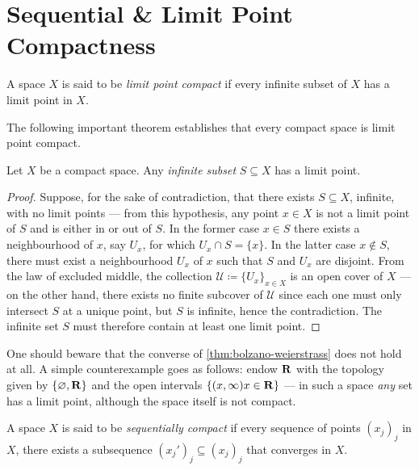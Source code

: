 \section{Sequential \& Limit Point Compactness}

\begin{definition}
\label{def:limit-point-compact}
A space \(X\) is said to be \emph{limit point compact} if every infinite subset
of \(X\) has a limit point in \(X\).
\end{definition}

The following important theorem establishes that every compact space is limit
point compact.

\begin{theorem}
\label{thm:bolzano-weierstrass}
Let \(X\) be a compact space. Any \emph{infinite subset} \(S \subseteq X\) has a
limit point.
\end{theorem}

\begin{proof}
Suppose, for the sake of contradiction, that there exists \(S \subseteq X\),
infinite, with no limit points --- from this hypothesis, any point \(x \in X\)
is not a limit point of \(S\) and is either in or out of \(S\). In the former
case \(x \in S\) there exists a neighbourhood of \(x\), say \(U_x\), for which
\(U_x \cap S = \{x\}\). In the latter case \(x \notin S\), there must exist a
neighbourhood \(U_x\) of \(x\) such that \(S\) and \(U_x\) are disjoint. From
the law of excluded middle, the collection
\(\mathcal{U} \coloneq \{U_x\}_{x \in X}\) is an open cover of \(X\) --- on the
other hand, there exists no finite subcover of \(\mathcal{U}\) since each one
must only intersect \(S\) at a unique point, but \(S\) is infinite, hence the
contradiction. The infinite set \(S\) must therefore contain at least one limit
point.
\end{proof}

\begin{remark}
\label{rem:bolzano-weierstrass}
One should beware that the converse of \cref{thm:bolzano-weierstrass} does not
hold at all. A simple counterexample goes as follows: endow \(\mathbf{R}\) with the
topology given by \(\{\varnothing, \mathbf{R}\}\) and the open intervals
\(\{(x, \infty) \relax x \in \mathbf{R}\}\) --- in such a space \emph{any} set has a
limit point, although the space itself is not compact.
\end{remark}

\begin{definition}
\label{def:sequentially-compact}
A space \(X\) is said to be \emph{sequentially compact} if every
sequence of points \((x_j)_j\) in \(X\), there exists a subsequence \((x_j')_j
\subseteq (x_j)_j\) that converges in \(X\).
\end{definition}

